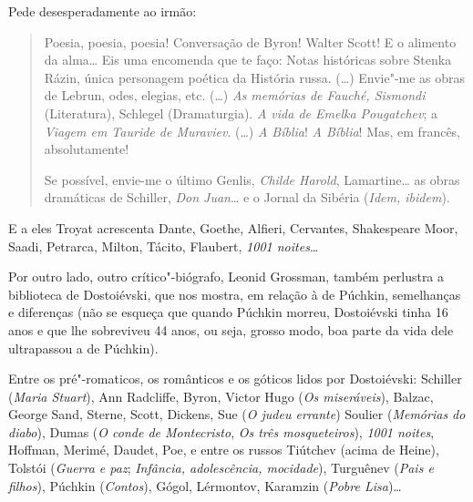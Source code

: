 Pede desesperadamente ao irmão:

\begin{quote}
Poesia, poesia, poesia! Conversação de Byron! Walter Scott! E o
alimento da alma\ldots{} Eis uma encomenda que te faço: Notas históricas
sobre Stenka Rázin, única personagem poética da História russa. (\ldots{})
Envie"-me as obras de Lebrun, odes, elegias, etc. (\ldots{}) \emph{As
memórias de Fauché, Sismondi} (Literatura), Schlegel (Dramaturgia).
\emph{A vida de Emelka Pougatchev}; a \emph{Viagem em Tauride de
Muraviev}. (\ldots{}) \emph{A Bíblia}! \emph{A Bíblia}! Mas, em francês,
absolutamente!

Se possível, envie-me o último Genlis, \emph{Childe Harold},
Lamartine\ldots{} as obras dramáticas de Schiller, \emph{Don Juan}\ldots{} e o
Jornal da Sibéria (\emph{Idem, ibidem}).
\end{quote}

E a eles Troyat acrescenta Dante, Goethe, Alfieri, Cervantes,
Shakespeare Moor, Saadi, Petrarca, Milton, Tácito, Flaubert, \emph{1001
noites}\ldots{}

Por outro lado, outro crítico"-biógrafo, Leonid Grossman, também
perlustra a biblioteca de Dostoiévski, que nos mostra, em relação à de
Púchkin, semelhanças e diferenças (não se esqueça que quando Púchkin
morreu, Dostoiévski tinha 16 anos e que lhe sobreviveu 44 anos, ou
seja, grosso modo, boa parte da vida dele ultrapassou a de Púchkin).

Entre os pré"-romaticos, os românticos e os góticos lidos por
Dostoiévski: Schiller (\emph{Maria Stuart}), Ann Radcliffe, Byron,
Victor Hugo (\emph{Os miseráveis}), Balzac, George Sand, Sterne, Scott, Dickens, Sue (\emph{O judeu errante}) Soulier (\emph{Memórias
do diabo}), Dumas (\emph{O conde de Montecristo}, \emph{Os três
mosqueteiros}), \emph{1001 noites}, Hoffman, Merimé, Daudet, Poe, e
entre os russos Tiútchev (acima de Heine), Tolstói (\emph{Guerra e paz}; \emph{Infância, adolescência, mocidade}), Turguênev (\emph{Pais e
filhos}), Púchkin (\emph{Contos}), Gógol, Lérmontov, Karamzin
(\emph{Pobre Lisa})\ldots{}


